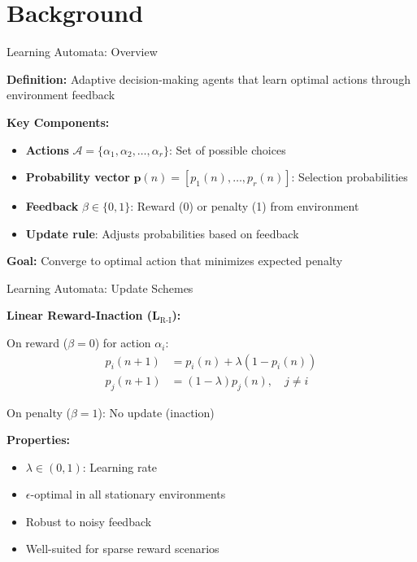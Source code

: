 \documentclass[10pt,xcolor={table,dvipsnames},t]{beamer}
\begin{document}
\section{Background}

\begin{frame}{Learning Automata: Overview}

\textbf{Definition:} Adaptive decision-making agents that learn optimal actions through environment feedback

\vspace{0.5em}
\textbf{Key Components:}
\begin{itemize}
  \item \textbf{Actions} $\mathcal{A} = \{\alpha_1, \alpha_2, \ldots, \alpha_r\}$: Set of possible choices
  \item \textbf{Probability vector} $\mathbf{p}(n) = [p_1(n), \ldots, p_r(n)]$: Selection probabilities
  \item \textbf{Feedback} $\beta \in \{0, 1\}$: Reward (0) or penalty (1) from environment
  \item \textbf{Update rule}: Adjusts probabilities based on feedback
\end{itemize}

\vspace{0.5em}
\textbf{Goal:} Converge to optimal action that minimizes expected penalty

\end{frame}

\begin{frame}{Learning Automata: Update Schemes}

\textbf{Linear Reward-Inaction (L$_{\text{R-I}}$):}

On reward ($\beta = 0$) for action $\alpha_i$:
\begin{align}
p_i(n+1) &= p_i(n) + \lambda(1 - p_i(n)) \\
p_j(n+1) &= (1-\lambda)p_j(n), \quad j \neq i
\end{align}

On penalty ($\beta = 1$): No update (inaction)

\vspace{0.5em}
\textbf{Properties:}
\begin{itemize}
  \item $\lambda \in (0,1)$: Learning rate
  \item $\epsilon$-optimal in all stationary environments
  \item Robust to noisy feedback
  \item Well-suited for sparse reward scenarios
\end{itemize}

\end{frame}
\end{document}

